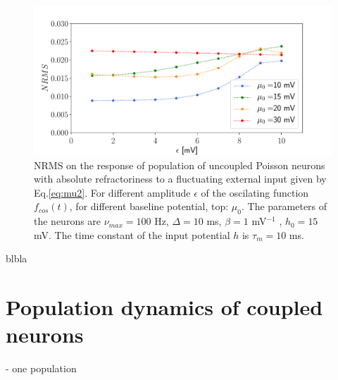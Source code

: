 \documentclass[12pt,twoside]{report}
\begin{document}
\begin{figure}[h!]
	\centering
	\includegraphics[width=0.9\linewidth]{NRMSe.pdf}
	\caption{NRMS on the response of population of uncoupled Poisson neurons with absolute refractoriness to a fluctuating external input given by Eq.\eqref{eq:mu2}. For different amplitude $\epsilon$ of the oscilating function $f_{cos}(t)$, for different baseline potential, top: $\mu_0$. The parameters of the neurons are $\nu_{max}=100$ Hz, $\Delta=10$ ms, $\beta=1$ mV$^{-1}$ , $h_0=15$ mV. The time constant of the input potential $h$ is $\tau_m=10$ ms.
	}
	\label{fig:NRMSe.}
\end{figure}




blbla \cite{GerKis14}




\chapter{Population dynamics of coupled neurons}

- one population




\clearpage

%

%
%
%
%

\renewcommand{\bibname}{References} %



\end{document}
